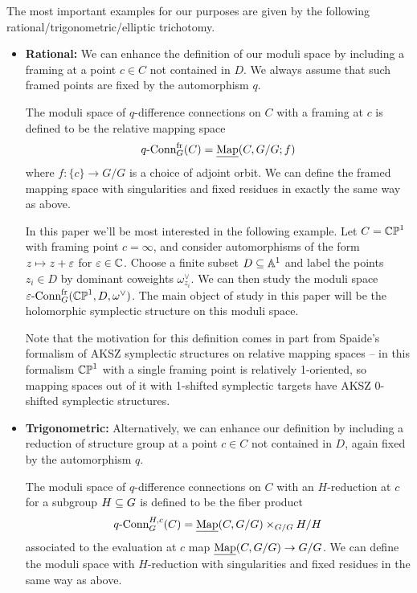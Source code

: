 \documentclass[10pt, oneside]{article}
\newcommand{\map}{\ul{\mr{Map}}}
\newcommand{\qconn}{q\text{-Conn}}
\newcommand{\epsconn}{\varepsilon\text{-Conn}}
\newcommand{\fr}{\mathrm{fr}}
\begin{document}
\begin{examples}
The most important examples for our purposes are given by the following rational/trigonometric/elliptic trichotomy.
 \begin{itemize}
  \item \textbf{Rational:} We can enhance the definition of our moduli space by including a framing at a point $c \in C$ not contained in $D$.  We always assume that such framed points are fixed by the automorphism $q$.
    \begin{definition}
      \label{def:framing}
    The moduli space of $q$-difference connections on $C$ with a framing at $c$ is defined to be the relative mapping space 
    \[\qconn_G^\fr(C) = \map(C, G/G; f)\]
    where $f \colon \{c\} \to G/G$ is a choice of adjoint orbit.  We can define the framed mapping space with singularities and fixed residues in exactly the same way as above.  
  \end{definition}
    
    In this paper we'll be most interested in the following example.  Let $C = \mathbb{CP}^1$ with framing point $c = \infty$, and consider automorphisms of the form $z \mapsto z + \varepsilon$ for $\varepsilon \in \mathbb{C}$.  Choose a finite subset $D \subseteq \mathbb{A}^1$ and label the points $z_i \in D$ by dominant coweights $\omega^\vee_{z_i}$.  We can then study the moduli space $\epsconn^\fr_G(\bb{CP}^1,D, \omega^\vee)$.  The main object of study in this paper will be the holomorphic symplectic structure on this moduli space.  
    
    Note that the motivation for this definition comes in part from Spaide's formalism \cite{Spaide} of AKSZ symplectic structures on relative mapping spaces -- in this formalism $\mathbb{CP}^1$ with a single framing point is relatively 1-oriented, so mapping spaces out of it with 1-shifted symplectic targets have AKSZ 0-shifted symplectic structures.
  
  \item \textbf{Trigonometric:} Alternatively, we can enhance our definition by including a reduction of structure group at a point $c \in C$ not contained in $D$, again fixed by the automorphism $q$.
  \begin{definition}
   The moduli space of $q$-difference connections on $C$ with an $H$-reduction at $c$ for a subgroup $H \subseteq G$ is defined to be the fiber product
   \[\qconn_G^{H,c}(C) = \map(C,G/G) \times_{G/G} H/H\]
   associated to the evaluation at $c$ map $\map(C,G/G) \to G/G$.  We can define the moduli space with $H$-reduction with singularities and fixed residues in the same way as above.
  \end{definition}
  

\end{itemize}
\end{examples}
\end{document}
